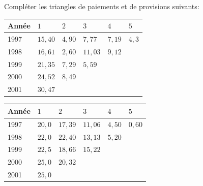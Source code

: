 \begin{exemple}
  Compléter les triangles de paiements et de provisions suivants:
  \begin{center}
    \begin{tabular}{|l|l l l l l|}\hline
      Année & $1$ & $2$ & $3$ & $4$ & $5$  \\ \hline
      1997 &$15,40$& $4,90$& $7,77$& $7,19$& $4,3$\\
      1998 &$16,61$& $2,60$& $11,03$& $9,12$& \\
      1999 &$21,35$& $7,29$& $5,59$& &\\
      2000 &$24,52$& $8,49$& & &\\
      2001 &$30,47$& & & &\\ \hline
    \end{tabular}
  \end{center}

  \begin{center}
    \begin{tabular}{|l|l l l l l|}\hline
      Année & $1$ & $2$ & $3$ & $4$ & $5$  \\ \hline
      1997 &$20,0$& $17,39$& $11,06$& $4,50$& $0,60$ \\
      1998 &$22,0$& $22,40$& $13,13$& $5,20$& \\
      1999 &$22,5$& $18,66$& $15,22$& & \\
      2000 &$25,0$& $20,32$& & &\\
      2001 &$25,0$&      & & & \\ \hline
    \end{tabular}
  \end{center}


\end{exemple}

